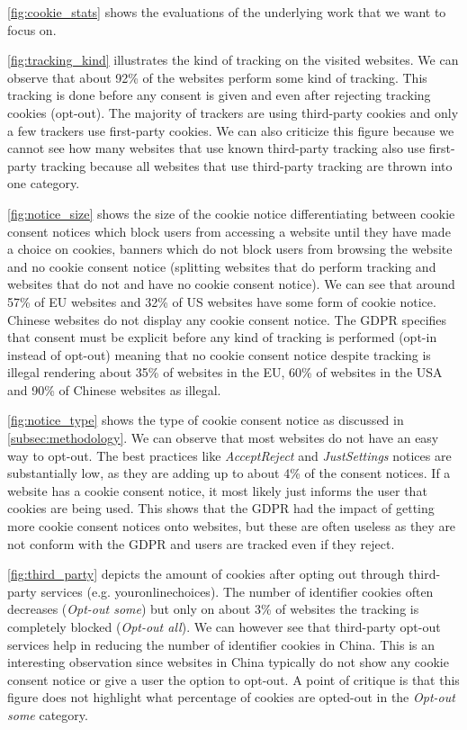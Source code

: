 \autoref{fig:cookie_stats} shows the evaluations of the underlying work that we want to focus on.

\autoref{fig:tracking_kind} illustrates the kind of tracking on the visited websites. We can observe that about 92\% of
the websites perform some kind of tracking. This tracking is done before any consent is given and even after rejecting
tracking cookies (opt-out). The majority of trackers are using third-party cookies and only a few trackers use
first-party cookies.
We can also criticize this figure because we cannot see how many websites that use known third-party tracking also use
first-party tracking because all websites that use third-party tracking are thrown into one category.

\autoref{fig:notice_size} shows the size of the cookie notice differentiating between cookie consent notices which block
users from accessing a website until they have made a choice on cookies, banners which do not block users from browsing the
website and no cookie consent notice (splitting websites that do perform tracking and websites that do not and have no
cookie consent notice).
We can see that around 57\% of EU websites and 32\% of US
websites have some form of cookie notice. Chinese websites do not display any cookie consent notice.
The GDPR specifies that consent must be explicit before any kind of tracking is performed
(opt-in instead of opt-out) meaning that no cookie consent notice despite tracking is illegal rendering about 35\% of
websites in the EU, 60\% of websites in the USA and 90\% of Chinese websites as illegal.

\autoref{fig:notice_type} shows the type of cookie consent notice as discussed in \autoref{subsec:methodology}.
We can observe that most websites do not have an easy way to opt-out. The best practices like \emph{AcceptReject} and
\emph{JustSettings} notices are substantially low, as they are adding up to about 4\% of the consent notices.
If a website has a cookie consent notice, it
most likely just informs the user that cookies are being used. This shows that the GDPR had the impact of getting more
cookie consent notices onto websites, but these are often useless as they are not conform with the GDPR and users are
tracked even if they reject.

\autoref{fig:third_party} depicts the amount of cookies after opting out through third-party services (e.g.
youronlinechoices). The number of identifier cookies often decreases
(\emph{Opt-out some}) but only on about 3\% of websites the tracking is completely blocked (\emph{Opt-out all}). We can
however see that third-party opt-out services help in reducing the number of identifier cookies in China. This is an
interesting observation since websites in China typically do not show any cookie consent notice or give a user the
option to opt-out. A point of critique is that this figure does not highlight what percentage of cookies are opted-out
in the \emph{Opt-out some} category.

